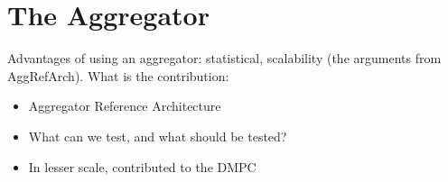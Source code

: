 \chapter{The Aggregator} %
\label{cha:aggregator}
Advantages of using an aggregator: statistical, scalability (the arguments from AggRefArch). What is the contribution:
\begin{itemize}
	\item Aggregator Reference Architecture
	\item What can we test, and what should be tested?
	\item In lesser scale, contributed to the DMPC
\end{itemize}
